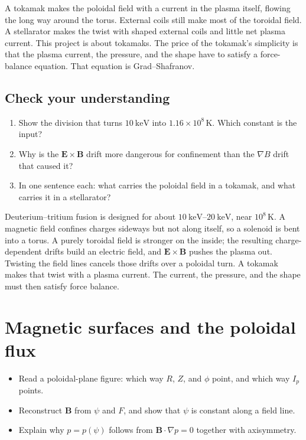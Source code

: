 \documentclass[11pt,a4paper,oneside,openany]{book}
\numberwithin{equation}{chapter}
\newcommand{\grad}{\nabla}
\newcommand{\Ip}{I_{p}}
\theoremstyle{definition}
\begin{document}
A tokamak makes the poloidal field with a current in the plasma itself, flowing the long way around the torus. External coils still make most of the toroidal field. A stellarator makes the twist with shaped external coils and little net plasma current. This project is about tokamaks. The price of the tokamak's simplicity is that the plasma current, the pressure, and the shape have to satisfy a force-balance equation. That equation is Grad--Shafranov.

\section*{Check your understanding}
\begin{enumerate}[label=\textbf{Q3.\arabic*.},leftmargin=2.4em]
\item Show the division that turns \(\qty{10}{\kilo\electronvolt}\) into \(1.16\times 10^{8}\,\mathrm{K}\). Which constant is the input?
\item Why is the \(\mathbf{E}\times\mathbf{B}\) drift more dangerous for confinement than the \(\grad B\) drift that caused it?
\item In one sentence each: what carries the poloidal field in a tokamak, and what carries it in a stellarator?
\end{enumerate}

\begin{keyideas}
Deuterium--tritium fusion is designed for about \(\qtyrange{10}{20}{\kilo\electronvolt}\), near \(10^{8}\,\mathrm{K}\). A magnetic field confines charges sideways but not along itself, so a solenoid is bent into a torus. A purely toroidal field is stronger on the inside; the resulting charge-dependent drifts build an electric field, and \(\mathbf{E}\times\mathbf{B}\) pushes the plasma out. Twisting the field lines cancels those drifts over a poloidal turn. A tokamak makes that twist with a plasma current. The current, the pressure, and the shape must then satisfy force balance.
\end{keyideas}

\chapter{Magnetic surfaces and the poloidal flux}
\label{ch:surfaces}

\begin{objectives}
\begin{itemize}[leftmargin=1.2em]
\item Read a poloidal-plane figure: which way \(R\), \(Z\), and \(\phi\) point, and which way \(\Ip\) points.
\item Reconstruct \(\mathbf{B}\) from \(\psi\) and \(F\), and show that \(\psi\) is constant along a field line.
\item Explain why \(p=p(\psi)\) follows from \(\mathbf{B}\cdot\grad p=0\) together with axisymmetry.
\end{itemize}
\end{objectives}
\end{document}
